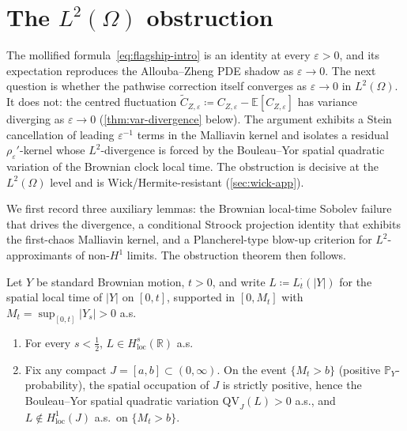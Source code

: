 \documentclass[EJP]{ejpecp}
\newcommand{\R}{\mathbb{R}}
\renewcommand{\E}{\mathbb{E}}
\newcommand{\Prob}{\mathbb{P}}
\newcommand{\IBM}{Z}
\begin{document}
\section{The $L^{2}(\Omega)$ obstruction}\label{sec:obstruction}

The mollified formula~\eqref{eq:flagship-intro} is an identity at
every $\varepsilon>0$, and its expectation reproduces the
Allouba--Zheng PDE shadow as $\varepsilon\to 0$. The next question
is whether the pathwise correction itself converges as
$\varepsilon\to 0$ in $L^{2}(\Omega)$. It does not: the centred
fluctuation
$\tilde C_{\IBM,\varepsilon}\coloneqq C_{\IBM,\varepsilon}-\E[C_{\IBM,\varepsilon}]$
has variance diverging as $\varepsilon\to 0$
(\cref{thm:var-divergence} below). The argument exhibits a Stein
cancellation of leading $\varepsilon^{-1}$ terms in the Malliavin
kernel and isolates a residual $\rho_\varepsilon'$-kernel whose
$L^{2}$-divergence is forced by the Bouleau--Yor spatial quadratic
variation of the Brownian clock local time. The obstruction is
decisive at the $L^{2}(\Omega)$ level and is Wick/Hermite-resistant
(\cref{sec:wick-app}).

We first record three auxiliary lemmas: the Brownian local-time
Sobolev failure that drives the divergence, a conditional Stroock
projection identity that exhibits the first-chaos Malliavin kernel,
and a Plancherel-type blow-up criterion for $L^{2}$-approximants of
non-$H^{1}$ limits. The obstruction theorem then follows.

\begin{lemma}\label{lem:lt-sobolev}
Let $Y$ be standard Brownian motion, $t>0$, and write
$L\coloneqq L_t^{\cdot}(|Y|)$ for the spatial local time of $|Y|$
on $[0,t]$, supported in $[0,M_t]$ with
$M_t=\sup_{[0,t]}|Y_s|>0$ a.s.
\begin{enumerate}
\item For every $s<\tfrac12$, $L\in H^{s}_{\mathrm{loc}}(\R)$ a.s.
\item Fix any compact $J=[a,b]\subset(0,\infty)$. On the event
$\{M_t>b\}$ (positive $\Prob_Y$-probability), the spatial occupation
of $J$ is strictly positive, hence the Bouleau--Yor spatial quadratic
variation $\mathrm{QV}_J(L)>0$ a.s., and
$L\notin H^{1}_{\mathrm{loc}}(J)$ a.s.\ on $\{M_t>b\}$.
\end{enumerate}
\end{lemma}
\end{document}
